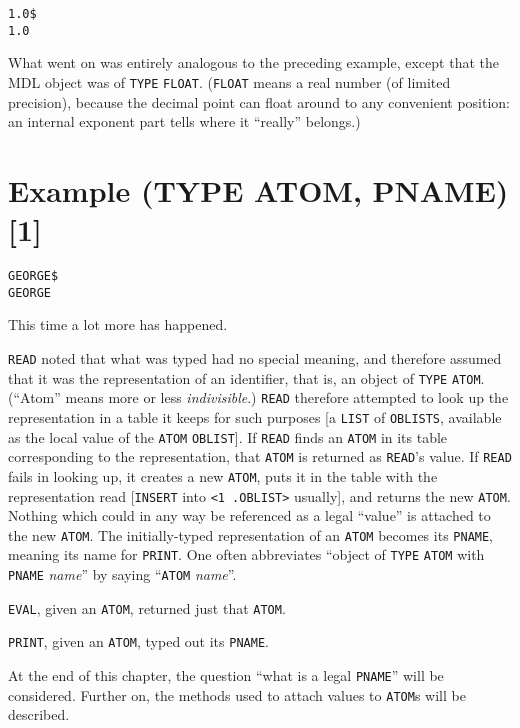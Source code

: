 \documentclass[a4paper]{scrbook}
\begin{document}
\begin{verbatim}
1.0$
1.0
\end{verbatim}

What went on was entirely analogous to the preceding example, except that the MDL object was of \texttt{TYPE}
\texttt{FLOAT}. (\texttt{FLOAT} means a real number (of limited precision), because the decimal point
can float around to any convenient position: an internal exponent part tells where it ``really'' belongs.)

\section{Example (TYPE ATOM, PNAME) {[}1{]}}\label{example-type-atom-pname-1}

\begin{verbatim}
GEORGE$
GEORGE
\end{verbatim}

This time a lot more has happened.

\texttt{READ} noted that what was typed had no special meaning, and therefore assumed that it was the representation of an
identifier, that is, an object of \texttt{TYPE} \texttt{ATOM}. (``Atom'' means more or less
\emph{indivisible}.) \texttt{READ} therefore attempted to look up the representation in a table it keeps for such purposes
{[}a \texttt{LIST} of \texttt{OBLISTS}, available as the local value of the \texttt{ATOM} \texttt{OBLIST}{]}. If
\texttt{READ} finds an \texttt{ATOM} in its table corresponding to the representation, that \texttt{ATOM} is returned as
\texttt{READ}'s value. If \texttt{READ} fails in looking up, it creates a new \texttt{ATOM}, puts it in the table with the
representation read {[}\texttt{INSERT} into \texttt{\textless{}1\ .OBLIST\textgreater{}} usually{]}, and returns the new
\texttt{ATOM}. Nothing which could in any way be referenced as a legal ``value'' is attached to the new \texttt{ATOM}. The
initially-typed representation of an \texttt{ATOM} becomes its \texttt{PNAME}, meaning its name for
\texttt{PRINT}. One often abbreviates ``object of \texttt{TYPE} \texttt{ATOM} with \texttt{PNAME} \emph{name}'' by saying
``\texttt{ATOM} \emph{name}''.

\texttt{EVAL}, given an \texttt{ATOM}, returned just that \texttt{ATOM}.

\texttt{PRINT}, given an \texttt{ATOM}, typed out its \texttt{PNAME}.

At the end of this chapter, the question ``what is a legal \texttt{PNAME}'' will be considered. Further on, the methods
used to attach values to \texttt{ATOM}s will be described.
\end{document}

